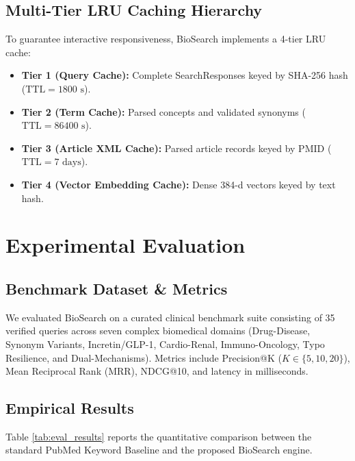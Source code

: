 \documentclass[conference]{IEEEtran}
\begin{document}
\subsection{Multi-Tier LRU Caching Hierarchy}
To guarantee interactive responsiveness, BioSearch implements a 4-tier LRU cache:
\begin{itemize}
    \item \textbf{Tier 1 (Query Cache):} Complete SearchResponses keyed by SHA-256 hash ($\text{TTL} = 1800\text{ s}$).
    \item \textbf{Tier 2 (Term Cache):} Parsed concepts and validated synonyms ($\text{TTL} = 86400\text{ s}$).
    \item \textbf{Tier 3 (Article XML Cache):} Parsed article records keyed by PMID ($\text{TTL} = 7\text{ days}$).
    \item \textbf{Tier 4 (Vector Embedding Cache):} Dense 384-d vectors keyed by text hash.
\end{itemize}

\section{Experimental Evaluation}

\subsection{Benchmark Dataset \& Metrics}
We evaluated BioSearch on a curated clinical benchmark suite consisting of 35 verified queries across seven complex biomedical domains (Drug-Disease, Synonym Variants, Incretin/GLP-1, Cardio-Renal, Immuno-Oncology, Typo Resilience, and Dual-Mechanisms). Metrics include Precision@K ($K \in \{5, 10, 20\}$), Mean Reciprocal Rank (MRR), NDCG@10, and latency in milliseconds.

\subsection{Empirical Results}
Table \ref{tab:eval_results} reports the quantitative comparison between the standard PubMed Keyword Baseline and the proposed BioSearch engine.
\end{document}
